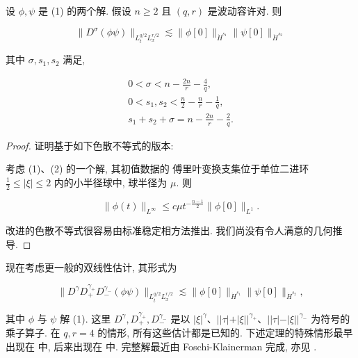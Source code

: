 \begin{proposition}\label{prop:cG-1.14}
设 $\phi,  \psi$ 是 (1) 的两个解. 假设 $n \geq 2$ 且 $(q,  r)$ 是波动容许对. 则

\begin{equation}
\| D ^ {\sigma} (\phi \psi) \| _ {L _ {t} ^ {q / 2} L _ {x} ^ {r / 2}} \lesssim \| \phi [ 0 ] \| _ {\dot {H} ^ {s _ {1}}} \| \psi [ 0 ] \| _ {\dot {H} ^ {s _ {2}}}\label{eq:cG-14}
\end{equation}

其中 $\sigma,  s_1,  s_2$ 满足, 

\begin{align*}
0 < \sigma < n - \frac {2 n}{r} - \frac {4}{q}, \\
0 < s _ {1},  s _ {2} < \frac {n}{2} - \frac {n}{r} - \frac {1}{q}, \\
s _ {1} + s _ {2} + \sigma = n - \frac {2 n}{r} - \frac {2}{q}.
\end{align*}
\end{proposition}

\begin{proof}
证明基于如下色散不等式的版本:

\begin{proposition}[改进的色散不等式{[}47{]}]\label{prop:cG-1.15}
考虑 (1)、(2) 的一个解, 其初值数据的 傅里叶变换支集位于单位二进环 $\frac{1}{2} \leq |\xi| \leq 2$ 内的小半径球中, 球半径为 $\mu$. 则

\begin{equation}
\| \phi (t) \| _ {L ^ {\infty}} \leq c \mu t ^ {- \frac {n - 1}{2}} \| \phi [ 0 ] \| _ {L ^ {1}}.\label{eq:cG-15}
\end{equation}
\end{proposition}

改进的色散不等式很容易由标准稳定相方法推出. 我们尚没有令人满意的几何推导. 
\end{proof}

现在考虑更一般的双线性估计, 其形式为

\begin{equation}
\| D ^ {\gamma} D _ {+} ^ {\gamma_+} D _ {-} ^ {\gamma_-} (\phi \psi) \| _ {L _ {t} ^ {q / 2} L _ {x} ^ {r / 2}} \lesssim \| \phi [ 0 ] \| _ {\dot {H} ^ {s _ {1}}} \| \psi [ 0 ] \| _ {\dot {H} ^ {s _ {2}}}, \label{eq:cG-16}
\end{equation}

其中 $\phi$ 与 $\psi$ 解 (1). 这里 $D^{\gamma},  D_{+}^{\gamma_+},  D_{-}^{\gamma_-}$ 是以 $|\xi|^{\gamma}$、$||\tau| + |\xi||^{\gamma_+}$、$||\tau| - |\xi||^{\gamma_-}$ 为符号的乘子算子. 在 $q,  r = 4$ 的情形, 所有这些估计都是已知的. 下述定理的特殊情形最早出现在 \cite{gfref31} 中, 后来出现在 \cite{gfref37, gfref44, gfref39} 中. 完整解最近由 Foschi-Klainerman \cite{gfref14} 完成, 亦见 \cite{gfref69}. 

